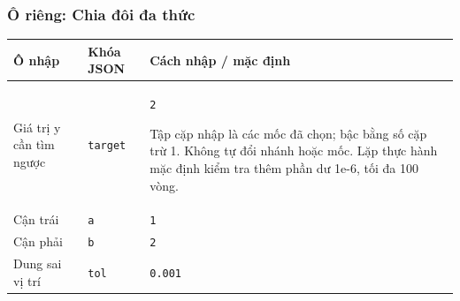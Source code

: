 \subsubsection*{Ô riêng: Chia đôi đa thức}
\begin{center}\small\begin{tabular}{@{}p{.32\linewidth}p{.17\linewidth}p{.43\linewidth}@{}}\toprule
Ô nhập & Khóa JSON & Cách nhập / mặc định\\\midrule
Giá trị y cần tìm ngược & \texttt{target} & \texttt{2}
\par Tập cặp nhập là các mốc đã chọn;\allowbreak{} bậc bằng số cặp trừ 1. Không tự đổi nhánh hoặc mốc. Lặp thực hành mặc định kiểm tra thêm phần dư 1e-6,\allowbreak{} tối đa 100 vòng.\\[3pt]
Cận trái & \texttt{a} & \texttt{1}\\[3pt]
Cận phải & \texttt{b} & \texttt{2}\\[3pt]
Dung sai vị trí & \texttt{tol} & \texttt{0.001}\\[3pt]
\bottomrule\end{tabular}\end{center}
